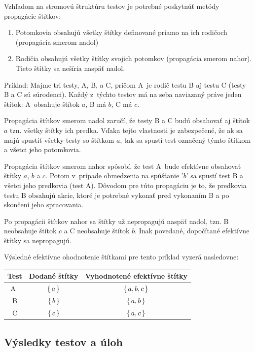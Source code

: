\documentclass[
  digital, %
  oneside, %
  table,   %
  lof,     %
  lot,   %
]{fithesis3}
\begin{document}
Vzhľadom na stromovú štruktúru testov je potrebné poskytnúť metódy propagácie štítkov:
\begin{enumerate}
    \item Potomkovia obsahujú všetky štítky definované priamo na ich rodičoch (propagácia smerom nadol)
    \item Rodičia obsahujú všetky štítky svojich potomkov (propagácia smerom nahor). Tieto štítky sa nešíria naspäť nadol.
\end{enumerate}

Príklad: Majme tri testy, A, B, a C, pričom A~je rodič testu B aj testu C (testy B a C sú súrodenci). Každý z~týchto testov má na seba naviazaný práve jeden štítok: A~obsahuje štítok $a$, B má $b$, C má $c$. 

Propagácia štítkov smerom nadol zaručí, že testy B a C budú obsahovať aj štítok $a$ tzn. všetky štítky ich predka. Vďaka tejto vlastnosti je zabezpečené, že ak sa majú spustiť všetky testy so štítkom $a$, tak sa spustí test označený týmto štítkom a všetci jeho potomkovia.

Propagácia štítkov smerom nahor spôsobí, že test A~bude efektívne obsahovať štítky $a$, $b$ a $c$. Potom v~prípade obmedzenia na spúšťanie '$b$' sa spustí test B a všetci jeho predkovia (test A). Dôvodom pre túto propagáciu je to, že predkovia testu B obsahujú akcie, ktoré je potrebné vykonať pred vykonaním B a po skončení jeho spracovania.

Po propagácii štítkov nahor sa štítky už nepropagujú naspäť nadol, tzn. B neobsahuje štítok $c$ a C neobsahuje štítok $b$. Inak povedané, dopočítané efektívne štítky sa nepropagujú.

Výsledné efektívne ohodnotenie štítkami pre tento príklad vyzerá nasledovne:
\begin{table}[h]
\begin{tabular}{c c c}
Test & Dodané štítky & Vyhodnotené efektívne štítky  \\ [0.5ex] 
\hline
A~& $\set{a}$ & $\set{a,b,c}$ \\
B & $\set{b}$ & $\set{a,b}$   \\
C & $\set{c}$ & $\set{a,c}$   \\
\end{tabular}
\end{table}


\subsection{Výsledky testov a úloh}
\end{document}
